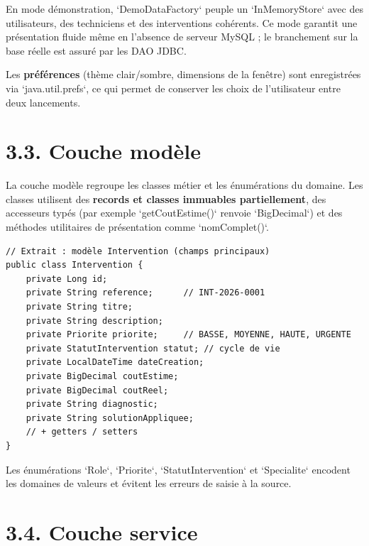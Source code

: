 \documentclass[11pt,a4paper]{report}
\begin{document}
En mode démonstration, `DemoDataFactory` peuple un `InMemoryStore` avec des utilisateurs, des techniciens et des interventions cohérents. Ce mode garantit une présentation fluide même en l'absence de serveur MySQL ; le branchement sur la base réelle est assuré par les DAO JDBC.

Les \textbf{préférences} (thème clair/sombre, dimensions de la fenêtre) sont enregistrées via `java.util.prefs`, ce qui permet de conserver les choix de l'utilisateur entre deux lancements.
\section*{3.3. Couche modèle}

La couche modèle regroupe les classes métier et les énumérations du domaine. Les classes utilisent des \textbf{records et classes immuables partiellement}, des accesseurs typés (par exemple `getCoutEstime()` renvoie `BigDecimal`) et des méthodes utilitaires de présentation comme `nomComplet()`.
\begin{lstlisting}
// Extrait : modèle Intervention (champs principaux)
public class Intervention {
    private Long id;
    private String reference;      // INT-2026-0001
    private String titre;
    private String description;
    private Priorite priorite;     // BASSE, MOYENNE, HAUTE, URGENTE
    private StatutIntervention statut; // cycle de vie
    private LocalDateTime dateCreation;
    private BigDecimal coutEstime;
    private BigDecimal coutReel;
    private String diagnostic;
    private String solutionAppliquee;
    // + getters / setters
}
\end{lstlisting}

Les énumérations `Role`, `Priorite`, `StatutIntervention` et `Specialite` encodent les domaines de valeurs et évitent les erreurs de saisie à la source.
\section*{3.4. Couche service}
\end{document}
